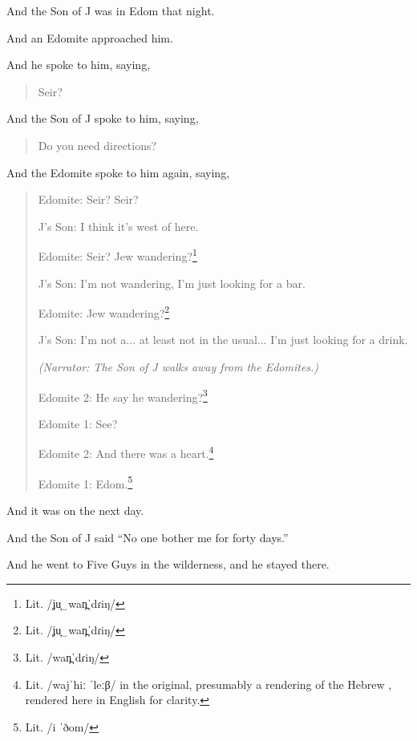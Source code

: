 {
    \hX{}
}
{
    \eX{}
}
{
	And the Son of J was in Edom that night.

	And an Edomite approached him.

	And he spoke to him, saying,

    \begin{quote}
        Seir?
	\end{quote}

	And the Son of J spoke to him, saying,

    \begin{quote}
        Do you need directions?
	\end{quote}

	And the Edomite spoke to him again, saying,

    \begin{quote}
		Edomite: Seir? Seir?

		J's Son: I think it's west of here.

		Edomite: Seir? Jew wandering?\footnote{Lit. /ʝu̞‿wan̪ˈdɾiŋ/}

        J's Son: I'm not wandering, I'm just looking for a bar.

		Edomite: Jew wandering?\footnote{Lit. /ʝu̞‿wan̪ˈdɾiŋ/}

		J's Son: I'm not a... at least not in the usual...  I'm just looking for a drink.

		\textsl{(Narrator: The Son of J walks away from the Edomites.)}

		Edomite 2: He say he wandering?\footnote{Lit. /wan̪ˈdɾiŋ/}

		Edomite 1: See?

		Edomite 2: And there was a heart.\footnote{
			Lit. /wajˈhiː ˈleːβ/ in the original,
			presumably a rendering of the Hebrew ,
			rendered here in English for clarity.
		}

        Edomite 1: Edom.\footnote{Lit. /i ˈðom/}
    \end{quote}

	And it was on the next day.
}

{
}
{
}
{
	And the Son of J said ``No one bother me for forty days.''
}

{
}
{
}
{
	And he went to Five Guys in the wilderness, and he stayed there.
}

